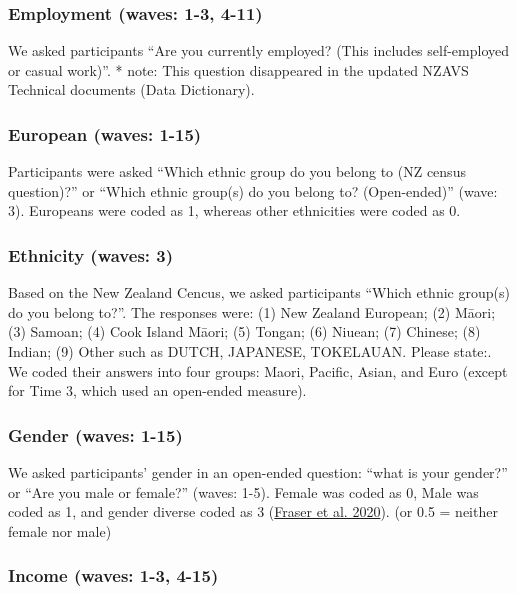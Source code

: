 \documentclass[
  singlecolumn]{report}
\begin{document}
\hypertarget{employment-waves-1-3-4-11}{%
\subsubsection{Employment (waves: 1-3,
4-11)}\label{employment-waves-1-3-4-11}}

We asked participants ``Are you currently employed? (This includes
self-employed or casual work)''. * note: This question disappeared in
the updated NZAVS Technical documents (Data Dictionary).

\hypertarget{european-waves-1-15}{%
\subsubsection{European (waves: 1-15)}\label{european-waves-1-15}}

Participants were asked ``Which ethnic group do you belong to (NZ census
question)?'' or ``Which ethnic group(s) do you belong to? (Open-ended)''
(wave: 3). Europeans were coded as 1, whereas other ethnicities were
coded as 0.

\hypertarget{ethnicity-waves-3}{%
\subsubsection{Ethnicity (waves: 3)}\label{ethnicity-waves-3}}

Based on the New Zealand Cencus, we asked participants ``Which ethnic
group(s) do you belong to?''. The responses were: (1) New Zealand
European; (2) Māori; (3) Samoan; (4) Cook Island Māori; (5) Tongan; (6)
Niuean; (7) Chinese; (8) Indian; (9) Other such as DUTCH, JAPANESE,
TOKELAUAN. Please state:. We coded their answers into four groups:
Maori, Pacific, Asian, and Euro (except for Time 3, which used an
open-ended measure).

\hypertarget{gender-waves-1-15}{%
\subsubsection{Gender (waves: 1-15)}\label{gender-waves-1-15}}

We asked participants' gender in an open-ended question: ``what is your
gender?'' or ``Are you male or female?'' (waves: 1-5). Female was coded
as 0, Male was coded as 1, and gender diverse coded as 3
(\protect\hyperlink{ref-fraser_coding_2020}{Fraser et al. 2020}). (or
0.5 = neither female nor male)

\hypertarget{income-waves-1-3-4-15}{%
\subsubsection{Income (waves: 1-3, 4-15)}\label{income-waves-1-3-4-15}}
\end{document}
